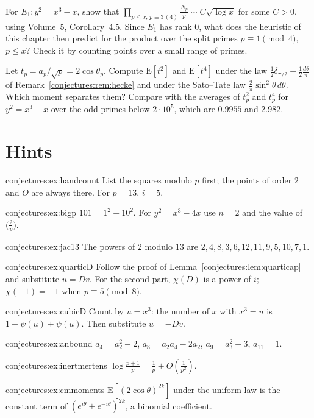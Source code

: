 \begin{exercise}[$\star\star$]\label{conjectures:ex:inertmertens}
For $E_1:y^2=x^3-x$, show that $\prod_{p\le x,\,p\equiv3\,(4)}\frac{N_p}p\sim C\sqrt{\log x}$ for some $C>0$, using Volume~5, Corollary~4.5. Since $E_1$ has rank
$0$, what does the heuristic of this chapter then predict for the product over the split primes $p\equiv1\pmod4$, $p\le x$? Check it by counting points over a small range of primes.
\end{exercise}

\begin{exercise}[$\star\star$]\label{conjectures:ex:cmmoments}
Let $t_p=a_p/\sqrt p=2\cos\theta_p$. Compute $\mathrm E[t^2]$ and $\mathrm E[t^4]$ under the law $\frac12\delta_{\pi/2}+\frac12\frac{d\theta}\pi$ of
Remark~\ref{conjectures:rem:hecke} and under the Sato--Tate law $\frac2\pi\sin^2\theta\,d\theta$. Which moment separates them? Compare with the averages of $t_p^2$ and $t_p^4$
for $y^2=x^3-x$ over the odd primes below $2\cdot10^5$, which are $0.9955$ and $2.982$.
\end{exercise}

\section{Hints}

\begin{hint}{conjectures:ex:handcount}
List the squares modulo $p$ first; the points of order $2$ and $O$ are always there. For $p=13$, $i=5$.
\end{hint}
\begin{hint}{conjectures:ex:bigp}
$101=1^2+10^2$. For $y^2=x^3-4x$ use $n=2$ and the value of $\bigl(\frac2p\bigr)$.
\end{hint}
\begin{hint}{conjectures:ex:jac13}
The powers of $2$ modulo $13$ are $2,4,8,3,6,12,11,9,5,10,7,1$.
\end{hint}
\begin{hint}{conjectures:ex:quarticD}
Follow the proof of Lemma~\ref{conjectures:lem:quarticap} and substitute $u=Dv$. For the second part, $\overline\chi(D)$ is a power of $i$; $\chi(-1)=-1$ when
$p\equiv5\pmod8$.
\end{hint}
\begin{hint}{conjectures:ex:cubicD}
Count by $u=x^3$: the number of $x$ with $x^3=u$ is $1+\psi(u)+\overline\psi(u)$. Then substitute $u=-Dv$.
\end{hint}
\begin{hint}{conjectures:ex:anbound}
$a_4=a_2^2-2$, $a_8=a_2a_4-2a_2$, $a_9=a_3^2-3$, $a_{11}=1$.
\end{hint}
\begin{hint}{conjectures:ex:inertmertens}
$\log\frac{p+1}p=\frac1p+O(\frac1{p^2})$.
\end{hint}
\begin{hint}{conjectures:ex:cmmoments}
$\mathrm E[(2\cos\theta)^{2k}]$ under the uniform law is the constant term of $(e^{i\theta}+e^{-i\theta})^{2k}$, a binomial coefficient.
\end{hint}

